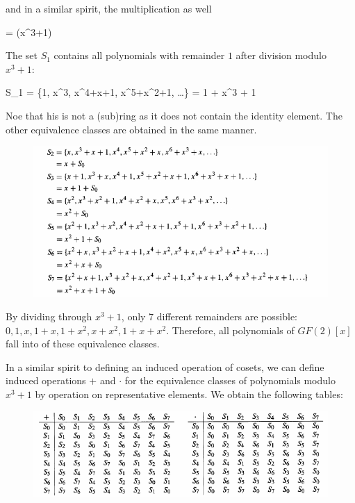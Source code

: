 and in a similar spirit, the multiplication as well

\bee
{} =    \bmod (x^3+1)
\eee

The set $S_1$ contains all polynomials with remainder $1$ after division modulo $x^3+1$:

\bee
S_1 = \{1, x^3, x^4+x+1, x^5+x^2+1, \ldots\} = 1 + \langle x^3 + 1 \rangle
\eee

Noe that his is not a (sub)ring as it does not contain the identity element. The other equivalence classes are obtained in the same manner.

\begin{figure}[H]
  \includegraphics[scale=0.65]{images/cyclic_codes_02.png}
\end{figure}

By dividing through $x^3+1$, only 7 different remainders are possible: $0, 1, x, 1+x, 1+x^2, x+x^2, 1+x+x^2$. Therefore, all polynomials of $GF(2)[x]$ fall into of these equivalence classes.

In a similar spirit to defining an induced operation of cosets, we can define induced operations $+$ and $\cdot$ for the equivalence classes of polynomials modulo $x^3+1$ by operation on representative elements. We obtain the following tables:

\begin{figure}[H]
  \includegraphics[scale=0.65]{images/cyclic_codes_03.png}
\end{figure}

